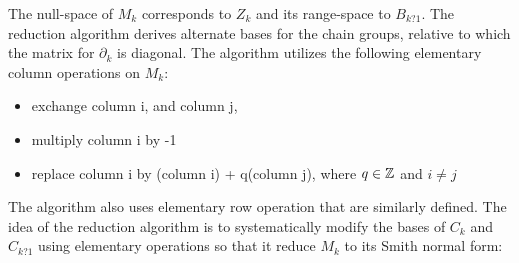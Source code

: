 \documentclass[11pt,a4paper]{report}
\begin{document}
               The null-space of $M_k$ corresponds to $Z_k$ and its range-space to
                $B_{k?1}$. The reduction algorithm derives alternate bases for the
                chain groups, relative to which the matrix for $\partial_k$ is diagonal. The algorithm utilizes the following elementary column operations on $M_k$:

                \begin{itemize}
                 \item exchange column i, and column j,
                 \item multiply column i by -1
                 \item replace column i by (column i) + q(column j), where $q \in \mathbb{Z}$ and $i \ne j$
                \end{itemize}

                The algorithm also uses elementary row operation that are similarly defined. The idea of the reduction algorithm is to systematically modify the bases of $C_k$ and $C_{k?1}$ using elementary operations so that it reduce $M_k$ to its Smith normal form:
\end{document}
